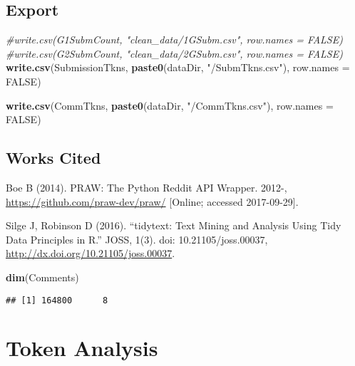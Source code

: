 \documentclass[
]{book}
\newenvironment{Shaded}{\begin{snugshade}}{\end{snugshade}}
\newcommand{\CommentTok}[1]{\textcolor[rgb]{0.56,0.35,0.01}{\textit{#1}}}
\newcommand{\DataTypeTok}[1]{\textcolor[rgb]{0.13,0.29,0.53}{#1}}
\newcommand{\KeywordTok}[1]{\textcolor[rgb]{0.13,0.29,0.53}{\textbf{#1}}}
\newcommand{\NormalTok}[1]{#1}
\newcommand{\OtherTok}[1]{\textcolor[rgb]{0.56,0.35,0.01}{#1}}
\newcommand{\StringTok}[1]{\textcolor[rgb]{0.31,0.60,0.02}{#1}}
\begin{document}
\hypertarget{export}{%
\section{Export}\label{export}}

\begin{Shaded}
\begin{Highlighting}[]
\CommentTok{#write.csv(G1SubmCount, "clean_data/1GSubm.csv", row.names = FALSE)}
\CommentTok{#write.csv(G2SubmCount, "clean_data/2GSubm.csv", row.names = FALSE)}
\KeywordTok{write.csv}\NormalTok{(SubmissionTkns, }\KeywordTok{paste0}\NormalTok{(dataDir, }\StringTok{"/SubmTkns.csv"}\NormalTok{), }\DataTypeTok{row.names =} \OtherTok{FALSE}\NormalTok{)}
\end{Highlighting}
\end{Shaded}

\begin{Shaded}
\begin{Highlighting}[]
\KeywordTok{write.csv}\NormalTok{(CommTkns, }\KeywordTok{paste0}\NormalTok{(dataDir, }\StringTok{"/CommTkns.csv"}\NormalTok{), }\DataTypeTok{row.names =} \OtherTok{FALSE}\NormalTok{)}
\end{Highlighting}
\end{Shaded}

\hypertarget{works-cited}{%
\section{Works Cited}\label{works-cited}}

Boe B (2014). PRAW: The Python Reddit API Wrapper. 2012-, \url{https://github.com/praw-dev/praw/} {[}Online; accessed 2017-09-29{]}.

Silge J, Robinson D (2016). ``tidytext: Text Mining and Analysis Using Tidy Data Principles in R.'' JOSS, 1(3). doi: 10.21105/joss.00037, \url{http://dx.doi.org/10.21105/joss.00037}.

\begin{Shaded}
\begin{Highlighting}[]
\KeywordTok{dim}\NormalTok{(Comments)}
\end{Highlighting}
\end{Shaded}

\begin{verbatim}
## [1] 164800      8
\end{verbatim}

\hypertarget{token-analysis}{%
\chapter{Token Analysis}\label{token-analysis}}
\end{document}
